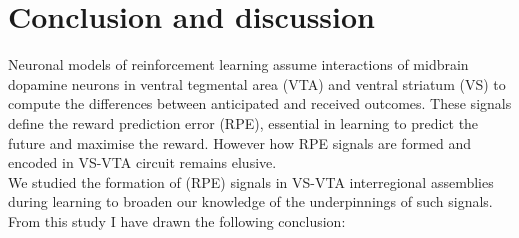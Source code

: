 \chapter{Conclusion and discussion}
\label{chap:Conclusion}
Neuronal models of reinforcement learning assume interactions of midbrain dopamine neurons in ventral tegmental area (VTA) and ventral striatum (VS) to compute the differences between anticipated and received outcomes. These signals define the reward prediction error (RPE), essential in learning to predict the future and maximise the reward. However how RPE signals are formed and encoded in VS-VTA circuit remains elusive.\\We studied the formation of (RPE) signals in VS-VTA interregional assemblies during learning to broaden our knowledge of the underpinnings of such signals. From this study I have drawn the following conclusion:
